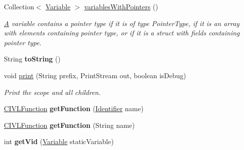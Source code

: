 \begin{DoxyCompactItemize}
Collection$<$ \hyperlink{interfaceedu_1_1udel_1_1cis_1_1vsl_1_1civl_1_1model_1_1IF_1_1variable_1_1Variable}{Variable} $>$ \hyperlink{classedu_1_1udel_1_1cis_1_1vsl_1_1civl_1_1model_1_1common_1_1CommonScope_ac6171c3e4b3b6478b5fbcdb8b0db7171}{variables\+With\+Pointers} ()
\begin{DoxyCompactList}\small\item\em \hyperlink{structA}{A} variable contains a pointer type if it is of type Pointer\+Type, if it is an array with elements containing pointer type, or if it is a struct with fields containing pointer type. \end{DoxyCompactList}\item 
\hypertarget{classedu_1_1udel_1_1cis_1_1vsl_1_1civl_1_1model_1_1common_1_1CommonScope_afcf8ed9c588e47cab80625745a37c388}{}String {\bfseries to\+String} ()\label{classedu_1_1udel_1_1cis_1_1vsl_1_1civl_1_1model_1_1common_1_1CommonScope_afcf8ed9c588e47cab80625745a37c388}

\item 
void \hyperlink{classedu_1_1udel_1_1cis_1_1vsl_1_1civl_1_1model_1_1common_1_1CommonScope_ae238d8750e0d96dfb9aa4bcb5b60551c}{print} (String prefix, Print\+Stream out, boolean is\+Debug)
\begin{DoxyCompactList}\small\item\em Print the scope and all children. \end{DoxyCompactList}\item 
\hypertarget{classedu_1_1udel_1_1cis_1_1vsl_1_1civl_1_1model_1_1common_1_1CommonScope_aea1939dbd82d139b68b6b4e89a20e870}{}\hyperlink{interfaceedu_1_1udel_1_1cis_1_1vsl_1_1civl_1_1model_1_1IF_1_1CIVLFunction}{C\+I\+V\+L\+Function} {\bfseries get\+Function} (\hyperlink{interfaceedu_1_1udel_1_1cis_1_1vsl_1_1civl_1_1model_1_1IF_1_1Identifier}{Identifier} name)\label{classedu_1_1udel_1_1cis_1_1vsl_1_1civl_1_1model_1_1common_1_1CommonScope_aea1939dbd82d139b68b6b4e89a20e870}

\item 
\hypertarget{classedu_1_1udel_1_1cis_1_1vsl_1_1civl_1_1model_1_1common_1_1CommonScope_a9a34654495d1dfab8ee655d85d12c81e}{}\hyperlink{interfaceedu_1_1udel_1_1cis_1_1vsl_1_1civl_1_1model_1_1IF_1_1CIVLFunction}{C\+I\+V\+L\+Function} {\bfseries get\+Function} (String name)\label{classedu_1_1udel_1_1cis_1_1vsl_1_1civl_1_1model_1_1common_1_1CommonScope_a9a34654495d1dfab8ee655d85d12c81e}

\item 
\hypertarget{classedu_1_1udel_1_1cis_1_1vsl_1_1civl_1_1model_1_1common_1_1CommonScope_a5918058c9652ccef203997223db1505a}{}int {\bfseries get\+Vid} (\hyperlink{interfaceedu_1_1udel_1_1cis_1_1vsl_1_1civl_1_1model_1_1IF_1_1variable_1_1Variable}{Variable} static\+Variable)\label{classedu_1_1udel_1_1cis_1_1vsl_1_1civl_1_1model_1_1common_1_1CommonScope_a5918058c9652ccef203997223db1505a}


\end{DoxyCompactItemize}
